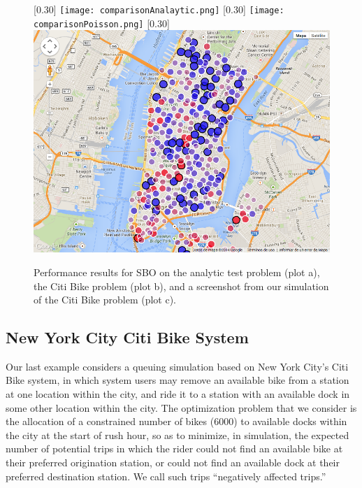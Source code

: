 \documentclass{article} %
\begin{document}
\begin{figure}[tb]
    \centering
    [0.30\linewidth]{
    \texttt{[image: comparisonAnalaytic.png]}}
    \quad
    [0.30\linewidth]{
      \texttt{[image: comparisonPoisson.png]}}
          \quad
     [0.30\linewidth]{
      \includegraphics[width=0.30\linewidth]{testStationMapPng0-full.png}}
\caption{Performance results for SBO on the analytic test problem (plot a), the Citi Bike problem (plot b), and a screenshot from our simulation of the Citi Bike problem (plot c).
    \label{fig:stuff}}
\end{figure}


\subsection{New York City Citi Bike System}
\label{sec:citibike}

Our last example considers a queuing simulation based on New York City's Citi Bike system, in which system users may remove an available bike from a station at one location within the city, and ride it to a station with an available dock in some other location within the city.  The optimization problem that we consider is the allocation of a constrained number of bikes (6000) to available docks within the city at the start of rush hour, so as to minimize, in simulation, the expected number of potential trips in which the rider could not find an available bike at their preferred origination station, or could not find an available dock at their preferred destination station.  We call such trips ``negatively affected trips.''

\end{document}
